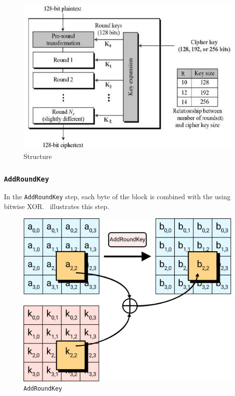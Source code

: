\begin{figure}[ht!]
  \centering
  \includegraphics[scale=0.35]{./Drawings/EDIN01-Cryptography/AES_Structure.jpg}
  \caption{ Structure}
  \label{fig:AES_Structure}
\end{figure}

\subsubsection{\texttt{AddRoundKey}}\label{subsubsec:AES-AddRoundKey}
In the \texttt{AddRoundKey} step, each byte of the block is combined with the  using bitwise XOR.\
 illustrates this step.
\begin{figure}[h!]
  \centering
  \includegraphics[scale=0.35]{./Drawings/EDIN01-Cryptography/AES-0-AddRoundKey.png}
  \caption{\nameref{def:AES} \texttt{AddRoundKey}}
  \label{fig:AES_AddRoundKey}
\end{figure}

